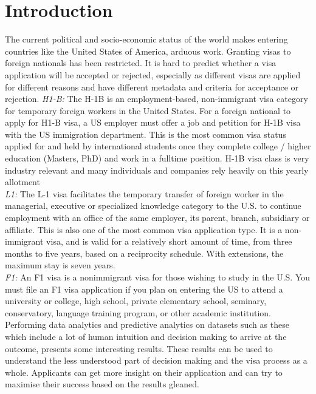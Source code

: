 \documentclass[conference]{IEEEtran}
\begin{document}
\section{Introduction}
The current political and socio-economic status of the world makes entering countries like the United States of America, arduous work. Granting visas to foreign nationals has been restricted. It is hard to predict whether a visa application will be accepted or rejected, especially as different visas are applied for different reasons and have different metadata and criteria for acceptance or rejection.
\textit{H1-B:}
The H-1B is an employment-based, non-immigrant
visa category for temporary foreign workers in the
United States. For a foreign national to apply for H1-B
visa, a US employer must offer a job and petition for
H-1B visa with the US immigration department. This
is the most common visa status applied for and held
by international students once they complete college /
higher education (Masters, PhD) and work in a fulltime
position. H-1B visa class is very industry relevant
and many individuals and companies rely heavily on
this yearly allotment\\
\textit{L1:}
The L-1 visa facilitates the temporary transfer of foreign worker in the managerial, executive or specialized knowledge category to the U.S. to continue employment with an office of the same employer, its parent, branch, subsidiary or affiliate. This is also one of the most common visa application type.  It is a non-immigrant visa, and is valid for a relatively short amount of time, from three months to five years, based on a reciprocity schedule. With extensions, the maximum stay is seven years.\\
\textit{F1:}
An F1 visa is a nonimmigrant visa for those wishing to study in the U.S. You must file an F1 visa application if you plan on entering the US to attend a university or college, high school, private elementary school, seminary, conservatory, language training program, or other academic institution.\\

Performing data analytics and predictive analytics on datasets such as these which include a lot of human intuition and decision making to arrive at the outcome, presents some interesting results. These results can be used to understand the less understood part of decision making and the visa process as a whole. Applicants can get more insight on their application and can try to maximise their success based on the results gleaned.
\end{document}
